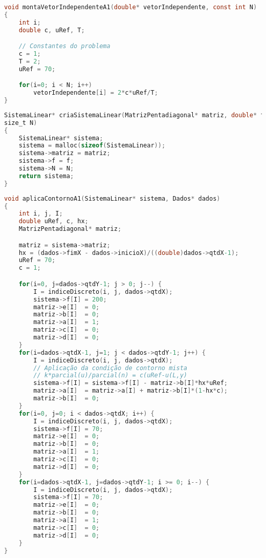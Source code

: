 \documentclass[
	11pt,				%
	oneside,			%
	a4paper,			%
	english,			%
	brazil,				%
	]{article}
\begin{document}
\begin{lstlisting}[language=C, caption=Função Cria Vetor Independente A1]
void montaVetorIndependenteA1(double* vetorIndependente, const int N)
{
    int i;
    double c, uRef, T;

    // Constantes do problema
    c = 1;
    T = 2;
    uRef = 70;

    for(i=0; i < N; i++)
        vetorIndependente[i] = 2*c*uRef/T;
}
\end{lstlisting}

\begin{lstlisting}[language=C, caption=Função Cria Sistema Linear]
SistemaLinear* criaSistemaLinear(MatrizPentadiagonal* matriz, double* f, const 
size_t N)
{
    SistemaLinear* sistema;
    sistema = malloc(sizeof(SistemaLinear));
    sistema->matriz = matriz;
    sistema->f = f;
    sistema->N = N;
    return sistema;
}
\end{lstlisting}

\begin{lstlisting}[language=C, caption=Função Aplica Contorno A1]
void aplicaContornoA1(SistemaLinear* sistema, Dados* dados)
{
	int i, j, I;
    double uRef, c, hx;
    MatrizPentadiagonal* matriz;

    matriz = sistema->matriz;
	hx = (dados->fimX - dados->inicioX)/((double)dados->qtdX-1);
    uRef = 70;
    c = 1;

    for(i=0, j=dados->qtdY-1; j > 0; j--) {
        I = indiceDiscreto(i, j, dados->qtdX);
        sistema->f[I] = 200;
        matriz->e[I]  = 0;
        matriz->b[I]  = 0;
        matriz->a[I]  = 1;
        matriz->c[I]  = 0;
        matriz->d[I]  = 0;
    }
    for(i=dados->qtdX-1, j=1; j < dados->qtdY-1; j++) {
        I = indiceDiscreto(i, j, dados->qtdX);
        // Aplicação da condição de contorno mista
        // k*parcial(u)/parcial(n) = c(uRef-u(L,y)
        sistema->f[I] = sistema->f[I] - matriz->b[I]*hx*uRef;
        matriz->a[I]  = matriz->a[I] + matriz->b[I]*(1-hx*c);
        matriz->b[I]  = 0;
    }
    for(i=0, j=0; i < dados->qtdX; i++) {
        I = indiceDiscreto(i, j, dados->qtdX);
        sistema->f[I] = 70;
        matriz->e[I]  = 0;
        matriz->b[I]  = 0;
        matriz->a[I]  = 1;
        matriz->c[I]  = 0;
        matriz->d[I]  = 0;
    }
    for(i=dados->qtdX-1, j=dados->qtdY-1; i >= 0; i--) {
        I = indiceDiscreto(i, j, dados->qtdX);
        sistema->f[I] = 70;
        matriz->e[I]  = 0;
        matriz->b[I]  = 0;
        matriz->a[I]  = 1;
        matriz->c[I]  = 0;
        matriz->d[I]  = 0;
    }
}
\end{lstlisting}
\end{document}
